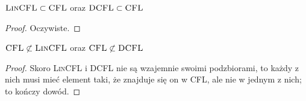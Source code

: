 \begin{theorem}
	\( \textsc{LinCFL} \subset \textsc{CFL}\) oraz \( \textsc{DCFL} \subset \textsc{CFL} \)
\end{theorem}
\begin{proof}
	Oczywiste.
\end{proof}

\begin{theorem}
	\( \textsc{CFL} \not\subset \textsc{LinCFL}\) oraz \( \textsc{CFL} \not \subset \textsc{DCFL} \)
\end{theorem}
\begin{proof}
	Skoro \textsc{LinCFL} i \textsc{DCFL} nie są wzajemnie swoimi podzbiorami, to każdy z nich musi mieć element taki, że znajduje się on w \textsc{CFL}, ale nie w jednym z nich; to kończy dowód.
\end{proof}